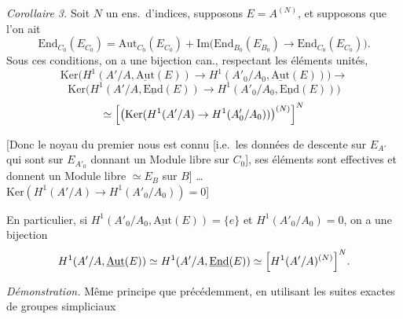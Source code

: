 \documentclass[11pt,a4paper]{article}
\begin{document}

\emph{Corollaire 3.} Soit $N$ un ens.\ d'indices,  supposons
$E = A^{(N)}$, et supposons que l'on ait
\[
  \mathrm{End}_{C_0}(E_{C_0}) = \mathrm{Aut}_{C_0}(E_{C_0})
  + \mathrm{Im}\bigl(\mathrm{End}_{B_0}(E_{B_0}) \to \mathrm{End}_{C_0}(E_{C_0})\bigr) .
\]
Sous ces conditions, on a une bijection can., respectant les éléments
unités,
\[
  \mathrm{Ker}\bigl(H^1(A'/A, \underline{\mathrm{Aut}}(E)) \to H^1(A'_0/A_0, \underline{\mathrm{Aut}}(E))\bigr)
  \to
\]
\[
  \mathrm{Ker}\bigl(H^1(A'/A, \underline{\mathrm{End}}(E)) \to H^1(A'_0/A_0, \underline{\mathrm{End}}(E))\bigr)
\]
\[
  \simeq \Bigl[\bigl(\mathrm{Ker}(H^1(A'/A) \to H^1(A'_0/A_0))\bigr)^{(N)}\Bigr]^{N}
\]

[Donc le noyau du premier nous est connu [i.e.\ les données de descente
sur $E_{A'}$ qui sont  sur $E_{A'_0}$
\struck{\ill{}}  donnant un Module libre
 sur $C_0$], ses éléments sont effectives et
donnent un Module libre $\simeq E_B$ sur $B$]  \ill{}
\ldots\ $\mathrm{Ker}(H^1(A'/A) \to H^1(A'_0/A_0)) = 0$]

En particulier, si $H^1(A'_0/A_0, \underline{\mathrm{Aut}}(E)) = \{e\}$ et
$H^1(A'_0/A_0) = 0$, on a une bijection
\[
  H^1(A'/A, \underline{\mathrm{Aut}}(E)) \simeq H^1(A'/A, \underline{\mathrm{End}}(E))
  \simeq \Bigl[H^1(A'/A)^{(N)}\Bigr]^{N} .
\]

\emph{Démonstration.} Même principe que précédemment, en utilisant les
suites exactes de groupes simpliciaux

\end{document}
